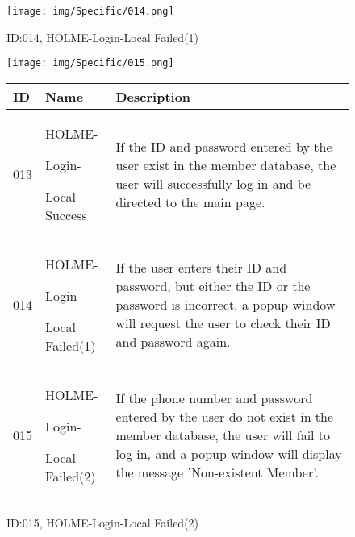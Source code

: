 \documentclass[conference]{IEEEtran}
\begin{document}
\begin{enumerate}
\clearpage


\begin{figure}[h]
\centering
\texttt{[image: img/Specific/014.png]}
\caption{ID:014, HOLME-Login-Local Failed(1)}

\texttt{[image: img/Specific/015.png]}
\caption{ID:015, HOLME-Login-Local Failed(2)}

\begin{tabular}{|p{1cm}|p{1.8cm}|p{5.0cm}|}
    \hline
    ID & Name & Description\\ \hline
     013 \par  & HOLME-\par Login-\par Local Success &If the ID and password entered by the user exist in the member database, the user will successfully log in and be directed to the main page.\\ \hline
014 \par  & HOLME-\par Login-\par Local Failed(1) &If the user enters their ID and password, but either the ID or the password is incorrect, a popup window will request the user to check their ID and password again.\\ \hline
015 \par  & HOLME-\par Login-\par Local Failed(2) &If the phone number and password entered by the user do not exist in the member database, the user will fail to log in, and a popup window will display the message 'Non-existent Member'.\\ \hline
\end{tabular}
\end{figure}


\end{enumerate}
\end{document}
